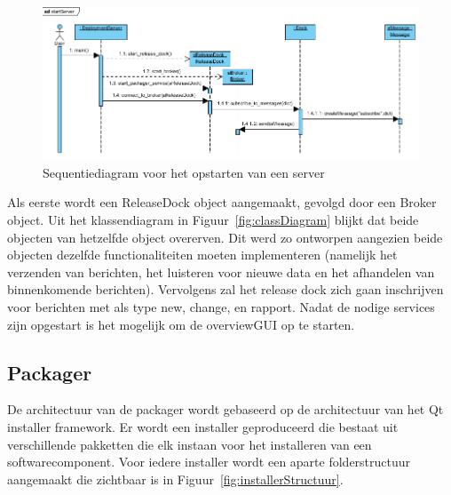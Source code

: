 \begin{figure}
\includegraphics[width=\textwidth,height=\textheight,keepaspectratio]{afbeelding/seqStartServer.png}
\centering
\caption{Sequentiediagram voor het opstarten van een server}
\label{fig:seqStartServer}
\end{figure}

Als eerste wordt een ReleaseDock object aangemaakt, gevolgd door een Broker object.
Uit het klassendiagram in Figuur~\ref{fig:classDiagram} blijkt dat beide objecten van hetzelfde object overerven.
Dit werd zo ontworpen aangezien beide objecten dezelfde functionaliteiten moeten implementeren (namelijk het verzenden van berichten, het luisteren voor nieuwe data en het afhandelen van binnenkomende berichten).
Vervolgens zal het release dock zich gaan inschrijven voor berichten met als type new, change, en rapport.
Nadat de nodige services zijn opgestart is het mogelijk om de overviewGUI op te starten.

\subsection{Packager}
De architectuur van de packager wordt gebaseerd op de architectuur van het Qt installer framework.
Er wordt een installer geproduceerd die bestaat uit verschillende pakketten die elk instaan voor het installeren van een softwarecomponent.
Voor iedere installer wordt een aparte folderstructuur aangemaakt die zichtbaar is in Figuur~\ref{fig:installerStructuur}.

